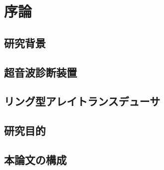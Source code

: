 \chapter{序論}

\section{研究背景}

\section{超音波診断装置}

\section{リング型アレイトランスデューサ}

\section{研究目的}

\section{本論文の構成}
